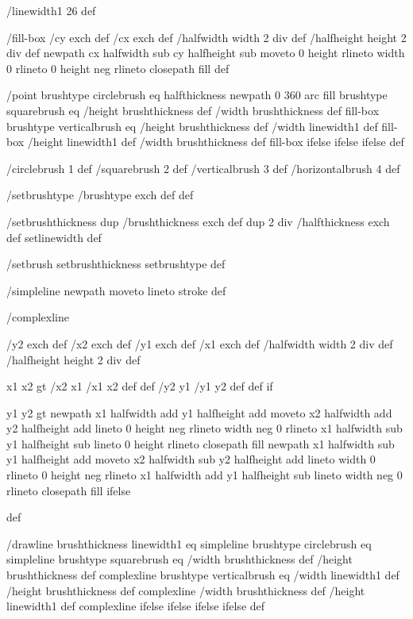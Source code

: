 /linewidth1 26 def

/fill-box
  { /cy exch def /cx exch def
    /halfwidth width 2 div def
    /halfheight height 2 div def
    newpath
     cx halfwidth sub cy halfheight sub moveto
     0 height rlineto
     width 0 rlineto
     0 height neg rlineto
     closepath
     fill } def

/point
  { brushtype circlebrush eq
     { halfthickness newpath 0 360 arc fill }
     { brushtype squarebrush eq
        { /height brushthickness def
	  /width brushthickness def
	  fill-box }
        { brushtype verticalbrush eq
           { /height brushthickness def
	     /width linewidth1 def
	     fill-box }
           { /height linewidth1 def
	     /width brushthickness def
	     fill-box }
	   ifelse }
        ifelse }
     ifelse } def

/circlebrush     1 def
/squarebrush     2 def
/verticalbrush   3 def
/horizontalbrush 4 def

/setbrushtype { /brushtype exch def } def

/setbrushthickness
  { dup /brushthickness exch def
    dup 2 div /halfthickness exch def
    setlinewidth } def

/setbrush { setbrushthickness setbrushtype } def

/simpleline { newpath moveto lineto stroke } def

/complexline
  { /y2 exch def /x2 exch def
    /y1 exch def /x1 exch def
    /halfwidth width 2 div def
    /halfheight height 2 div def

    x1 x2 gt { /x2 x1 /x1 x2 def def /y2 y1 /y1 y2 def def } if

    y1 y2 gt
     { %
       newpath
        x1 halfwidth add y1 halfheight add moveto
	x2 halfwidth add y2 halfheight add lineto
	0 height neg rlineto
        width neg 0 rlineto
        x1 halfwidth sub y1 halfheight sub lineto
        0 height rlineto
        closepath
	fill }
     { %
       newpath
        x1 halfwidth sub y1 halfheight add moveto
	x2 halfwidth sub y2 halfheight add lineto
	width 0 rlineto
	0 height neg rlineto
	x1 halfwidth add y1 halfheight sub lineto
	width neg 0 rlineto
	closepath
	fill }
     ifelse } def

/drawline
  { brushthickness linewidth1 eq
    { simpleline }
    { brushtype circlebrush eq
       { %
         simpleline }
       { brushtype squarebrush eq
          { %
            /width brushthickness def
	    /height brushthickness def
	    complexline }
          { brushtype verticalbrush eq
             { %
	       /width linewidth1 def
	       /height brushthickness def
	       complexline }
             { %
	       /width brushthickness def
	       /height linewidth1 def
	       complexline }
             ifelse }
          ifelse }
       ifelse }
    ifelse } def

